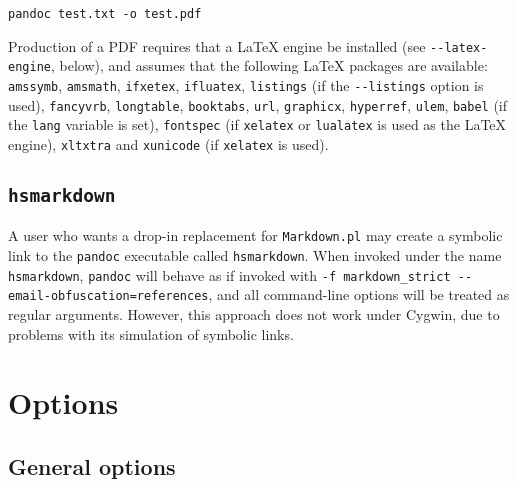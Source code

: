 \documentclass[]{article}
\begin{document}
\begin{verbatim}
pandoc test.txt -o test.pdf
\end{verbatim}

Production of a PDF requires that a LaTeX engine be installed (see
\texttt{-{}-latex-engine}, below), and assumes that the following LaTeX
packages are available: \texttt{amssymb}, \texttt{amsmath},
\texttt{ifxetex}, \texttt{ifluatex}, \texttt{listings} (if the
\texttt{-{}-listings} option is used), \texttt{fancyvrb},
\texttt{longtable}, \texttt{booktabs}, \texttt{url}, \texttt{graphicx},
\texttt{hyperref}, \texttt{ulem}, \texttt{babel} (if the \texttt{lang}
variable is set), \texttt{fontspec} (if \texttt{xelatex} or
\texttt{lualatex} is used as the LaTeX engine), \texttt{xltxtra} and
\texttt{xunicode} (if \texttt{xelatex} is used).

\subsection{\texttt{hsmarkdown}}

A user who wants a drop-in replacement for \texttt{Markdown.pl} may
create a symbolic link to the \texttt{pandoc} executable called
\texttt{hsmarkdown}. When invoked under the name \texttt{hsmarkdown},
\texttt{pandoc} will behave as if invoked with
\texttt{-f markdown\_strict -{}-email-obfuscation=references}, and all
command-line options will be treated as regular arguments. However, this
approach does not work under Cygwin, due to problems with its simulation
of symbolic links.

\section{Options}

\subsection{General options}
\end{document}
